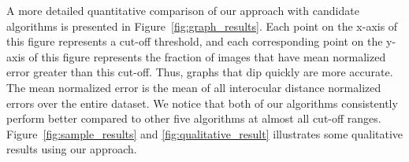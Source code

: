 A more detailed quantitative comparison of our approach with candidate algorithms is
presented in Figure~\ref{fig:graph_results}.
Each point on the x-axis of this figure represents a cut-off threshold, and each corresponding
point on the y-axis of this figure represents the fraction of images that have 
mean normalized error greater than this cut-off. Thus, graphs that dip quickly are 
more accurate.
The mean normalized error is the mean of all interocular distance
normalized errors over the entire dataset. 
We notice that both of our algorithms consistently perform better 
compared to other five algorithms at almost all cut-off ranges.
Figure~\ref{fig:sample_results} and \ref{fig:qualitative_result} illustrates some qualitative results using our approach.

